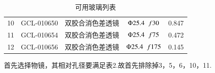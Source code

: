 \documentclass{article}
\begin{document}
\begin{table}[H]
\begin{tabular}{|c|cccc|}
  10&GCL-010650&
  双胶合消色差透镜&
  $\Phi 25.4 \hspace{0.2cm}  f 30$& 0.847\\

  11&GCL-010654&
  双胶合消色差透镜&
  $\Phi 25.4 \hspace{0.2cm}  f 75$&0.472\\

  12&GCL-010656&
  双胶合消色差透镜&
  $\Phi 25.4 \hspace{0.2cm}  f 175$&0.145\\ \hline
  
  
 
  

  \end{tabular}
  \caption{可用玻璃列表}
  \end{table}
  首先选择物镜，其相对孔径要满足表2.故首先排除掉3，5，6，10，11.
\end{document}
